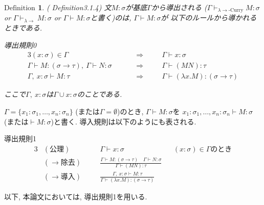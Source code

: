 \documentclass[11pt]{jsreport}
\theoremstyle{mystyle}
\newtheorem{df}{$\textrm{Definition}$}[section]
\newcommand{\lama}{\lambda \! \! \to}
\newcommand{\0}{\textbf{0}}
\begin{document}
\begin{shadebox}
  \begin{df}{(\cite{Bar} Definition3.1.4)}
    文$M \colon \sigma$が基底$\Gamma$から導出される
    ($\Gamma \vdash_{\lama\text{-Curry}} M \colon \sigma$ or 
    $\Gamma \vdash_{\lama} M \colon \sigma$ or 
    $\Gamma \vdash M \colon \sigma$と書く)のは, $\Gamma \vdash M \colon \sigma$が
    以下のルールから導かれるときである. 
    \begin{itembox}[c]{導出規則0}
      \begin{alignat*}{3}
  (x \colon \sigma) \in \Gamma &\quad& &\Rightarrow& \quad
    &\Gamma \vdash x \colon \sigma \\
  \Gamma \vdash M \colon (\sigma \to \tau),\ \Gamma \vdash N \colon \sigma &&
    &\Rightarrow& &\Gamma \vdash (MN) \colon \tau \\
  \Gamma,\ x \colon \sigma \vdash M \colon \tau && &\Rightarrow& 
    &\Gamma \vdash (\lambda x . M) \colon (\sigma \to \tau) 
      \end{alignat*}
    \end{itembox}
    ここで$\Gamma ,\ x \colon \sigma$は$\Gamma \cup x \colon \sigma$のことである.
  \end{df}
\end{shadebox}
$\Gamma = \{ x_1 \colon \sigma_1 , \ldots , x_n \colon \sigma_n\}$
(または$\Gamma = \emptyset$)のとき, $\Gamma \vdash M \colon \sigma$を
$x_1 \colon \sigma_1 , \ldots , x_n \colon \sigma_n \vdash M \colon \sigma$
(または$\vdash M \colon \sigma$)と書く. 
導入規則は以下のようにも表される.
\begin{itembox}[c]{導出規則1}
  \begin{alignat*}{3}
    &(\text{公理})& \quad &\Gamma \vdash x \colon \sigma& 
      &(x \colon \sigma) \in \Gamma \text{のとき}\\
    &(\text{$\to$除去})& 
      &\frac{\Gamma \vdash M \colon (\sigma \to \tau) \quad
        \Gamma \vdash N \colon \sigma}{\Gamma \vdash (MN) \colon \tau}& & \\
    &(\text{$\to$導入})& &\frac{\Gamma,\ x \colon \sigma \vdash M \colon \tau}
      {\Gamma \vdash (\lambda x . M) \colon (\sigma \to \tau)}& &
  \end{alignat*}
\end{itembox}
以下, 本論文においては, 導出規則1を用いる.
\end{document}

